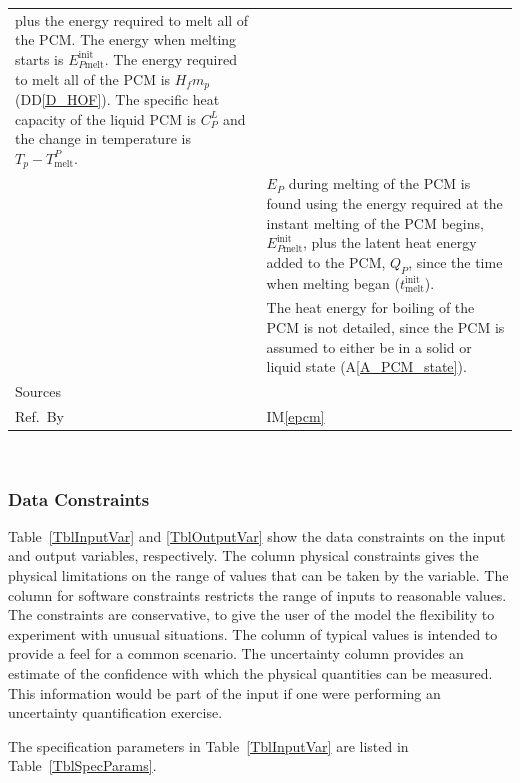 \documentclass[12pt]{article}
\newcommand{\colAwidth}{0.13\textwidth}
\newcommand{\colBwidth}{0.82\textwidth}
\newcommand{\ddref}[1]{DD\ref{#1}}
\newcommand{\aref}[1]{A\ref{#1}}
\newcommand{\iref}[1]{IM\ref{#1}}
\begin{document}
\begin{minipage}{\textwidth}
\begin{tabular}{| p{\colAwidth} | p{\colBwidth}|}
        plus the energy required to melt all of
        the PCM.  The energy when melting starts is
        $E_{P\text{melt}}^{\text{init}}$.  The energy required to melt all of the PCM is 
        $H_f m_p$ (\ddref{D_HOF}).  The specific heat capacity of the liquid PCM is
        $C_P^L$ and the change in temperature is $T_p - T_\text{melt}^P$.\\
      &$E_P$ during melting of the PCM is found using the energy required at the
        instant melting of the PCM begins, 
        $E_{P\text{melt}}^{\text{init}}$, plus the latent heat energy added to
        the PCM, $Q_P$, since the time when melting began ($t_\text{melt}^\text{init}$).\\
      &The heat energy for boiling of the PCM is not detailed, since the
        PCM is assumed 
        to either be in a solid or liquid state (\aref{A_PCM_state}).
  \\
  \hline
  Sources&~\cite{Lightstone2012} \ \\
  \hline
  Ref.\ By & \iref{epcm}\\
  \hline
\end{tabular}
\end{minipage}\\

\subsubsection{Data Constraints} \label{sec_DataConstraints}    

Table~\ref{TblInputVar} and \ref{TblOutputVar} show the data constraints on the
input and output variables, respectively.  The column physical constraints gives
the physical limitations on the range of values that can be taken by the
variable.  The column for software constraints restricts the range of inputs to
reasonable values.  The constraints are conservative, to give the user of the
model the flexibility to experiment with unusual situations.  The column of
typical values is intended to provide a feel for a common scenario.  The
uncertainty column provides an estimate of the confidence with which the
physical quantities can be measured.  This information would be part of the
input if one were performing an uncertainty quantification exercise.

The specification parameters in Table~\ref{TblInputVar} are listed in
Table~\ref{TblSpecParams}.
\end{document}
